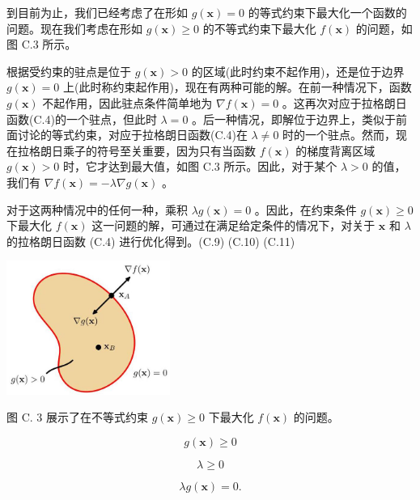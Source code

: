 \documentclass[10pt]{report}
\begin{document}
到目前为止，我们已经考虑了在形如 \(g\left( \mathbf{x}\right)  = 0\) 的等式约束下最大化一个函数的问题。现在我们考虑在形如 \(g\left( \mathbf{x}\right)  \geq  0\) 的不等式约束下最大化 \(f\left( \mathbf{x}\right)\) 的问题，如图 C.3 所示。

根据受约束的驻点是位于 \(g\left( \mathbf{x}\right)  > 0\) 的区域(此时约束不起作用)，还是位于边界 \(g\left( \mathbf{x}\right)  = 0\) 上(此时称约束起作用)，现在有两种可能的解。在前一种情况下，函数 \(g\left( \mathbf{x}\right)\) 不起作用，因此驻点条件简单地为 \(\nabla f\left( \mathbf{x}\right)  = 0\) 。这再次对应于拉格朗日函数(C.4)的一个驻点，但此时 \(\lambda  = 0\) 。后一种情况，即解位于边界上，类似于前面讨论的等式约束，对应于拉格朗日函数(C.4)在 \(\lambda  \neq  0\) 时的一个驻点。然而，现在拉格朗日乘子的符号至关重要，因为只有当函数 \(f\left( \mathbf{x}\right)\) 的梯度背离区域 \(g\left( \mathbf{x}\right)  > 0\) 时，它才达到最大值，如图 C.3 所示。因此，对于某个 \(\lambda  > 0\) 的值，我们有 \(\nabla f\left( \mathbf{x}\right)  =  - \lambda \nabla g\left( \mathbf{x}\right)\) 。

对于这两种情况中的任何一种，乘积 \({\lambda g}\left( \mathbf{x}\right)  = 0\) 。因此，在约束条件 \(g\left( \mathbf{x}\right)  \geq  0\) 下最大化 \(f\left( \mathbf{x}\right)\) 这一问题的解，可通过在满足给定条件的情况下，对关于 \(\mathbf{x}\) 和 \(\lambda\) 的拉格朗日函数 (C.4) 进行优化得到。(C.9) (C.10) (C.11)

\begin{center}
\includegraphics[max width=0.4\textwidth]{images/0194e279-9b28-703a-88f4-c3ac21e2010d_642_1006_1541_542_445_0.jpg}
\end{center}
\hspace*{3em} 

图 C. 3 展示了在不等式约束 \(g\left( \mathbf{x}\right)  \geq  0\) 下最大化 \(f\left( \mathbf{x}\right)\) 的问题。

\[
g\left( \mathbf{x}\right)  \geq  0
\]

\[
\lambda  \geq  0
\]

\[
{\lambda g}\left( \mathbf{x}\right)  = 0.
\]
\end{document}
